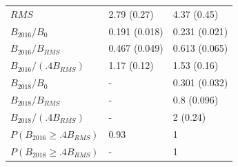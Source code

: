\documentclass[11pt]{book}
\begin{document}
\begin{longtable}[t]{lll}
$RMS$ & 2.79 (0.27) & 4.37 (0.45)\\
$B_{2016}/B_0$ & 0.191 (0.018) & 0.231 (0.021)\\
$B_{2016}/B_{RMS}$ & 0.467 (0.049) & 0.613 (0.065)\\
$B_{2016}/(.4B_{RMS})$ & 1.17 (0.12) & 1.53 (0.16)\\
$B_{2018}/B_0$ & - & 0.301 (0.032)\\
$B_{2018}/B_{RMS}$ & - & 0.8 (0.096)\\
$B_{2018}/(.4B_{RMS})$ & - & 2 (0.24)\\
$P(B_{2016} \geq .4B_{RMS})$ & 0.93 & 1\\
$P(B_{2018} \geq .4B_{RMS})$ & - & 1\\
\bottomrule
\end{longtable}
\endgroup{}
\endgroup{}
\end{document}
